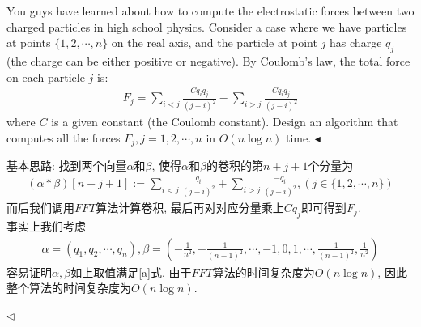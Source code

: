 \documentclass[11pt]{article}
\newenvironment{problem}[2][Problem]{\begin{trivlist}
\item[\hskip \labelsep{\bfseries#1}\hskip\labelsep{\bfseries#2.}]}{\hfill$\blacktriangleleft$\end{trivlist}}
\newenvironment{answer}[1][Answer]{\begin{trivlist}
\item[\hskip \labelsep{\bfseries\itshape#1.}\hskip \labelsep]}{\hfill$\lhd$\end{trivlist}}
\begin{document}
\begin{problem}{3 (Forces Between Particles)}
    You guys have learned about how to compute the electrostatic forces between two charged particles in high 
    school physics. Consider a case where we have particles at points $\{1, 2, \cdots , n\}$ on the real axis, 
    and the particle at point $j$ has charge $q_j$ (the charge can be either positive or negative). 
    By Coulomb’s law, the total force on each particle $j$ is:
    \begin{align*}
        F_j = \sum_{i < j}\frac{C q_i q_j}{(j-i)^2} - \sum_{i > j}\frac{C q_i q_j}{(j-i)^2}
    \end{align*}
    where $C$ is a given constant (the Coulomb constant). Design an algorithm that
    computes all the forces $F_j, j = 1, 2, \cdots, n$ in $O(n \log n)$ time.
\end{problem}
\begin{answer}
    基本思路: 找到两个向量$\alpha$和$\beta$, 使得$\alpha$和$\beta$的卷积的第$n+j+1$个分量为
    \begin{align} 
        (\alpha * \beta)[n+j+1] := \sum_{i<j} \frac{q_i}{(j-i)^2} + \sum_{i>j} \frac{-q_i}{(j-i)^2}, (j \in \{1, 2, \cdots, n\})
        \label{a}
    \end{align}
    而后我们调用$FFT$算法计算卷积, 最后再对对应分量乘上$C q_j$即可得到$F_j$. 
    \\事实上我们考虑
    \begin{align*}
        \alpha = \left(q_1, q_2, \cdots, q_n\right), 
        \beta = \left(-\frac{1}{n^2}, -\frac{1}{(n-1)^2}, \cdots, -1, 0, 1, \cdots, \frac{1}{(n-1)^2}, \frac{1}{n^2}\right)
    \end{align*}
    容易证明$\alpha, \beta$如上取值满足\ref{a}式. 由于$FFT$算法的时间复杂度为$O(n \log n)$, 因此整个算法的时间复杂度为$O(n \log n)$.


\end{answer}
\end{document}
